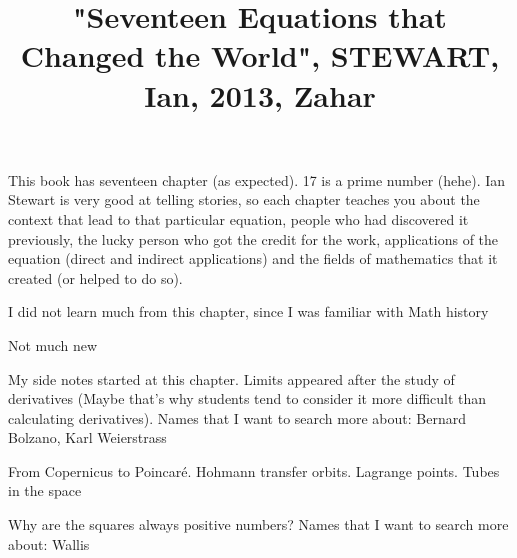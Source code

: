 \documentclass{cornell}
\begin{document}
 

\title{
    \vspace{-3em}
        \begin{tcolorbox}[colframe=white,opacityback=0]
            \begin{tcolorbox}
                \Huge\sffamily "Seventeen Equations that Changed the World", STEWART, Ian, 2013, Zahar
            \end{tcolorbox}
        \end{tcolorbox}
    \vspace{-3em}
}
\maketitle

\begin{tcolorbox}
\end{tcolorbox}


\noindent
This book has seventeen chapter (as expected). 17 is a prime number (hehe). Ian Stewart is very good at telling stories, so each chapter teaches you about the context that lead to that particular equation, people who had discovered it previously, the lucky person who got the credit for the work, applications of the equation (direct and indirect applications) and the fields of mathematics that it created (or helped to do so).

%
{I did not learn much from this chapter, since I was familiar with Math history}%

%
{Not much new}%

%
{My side notes started at this chapter. Limits appeared after the study of derivatives (Maybe that's why students tend to consider it more difficult than calculating derivatives).}%
{Names that I want to search more about: Bernard Bolzano, Karl Weierstrass}%

%
{From Copernicus to Poincaré. Hohmann transfer orbits. Lagrange points. Tubes in the space}%

%
{Why are the squares always positive numbers?}%
{Names that I want to search more about: Wallis}%
\end{document}
